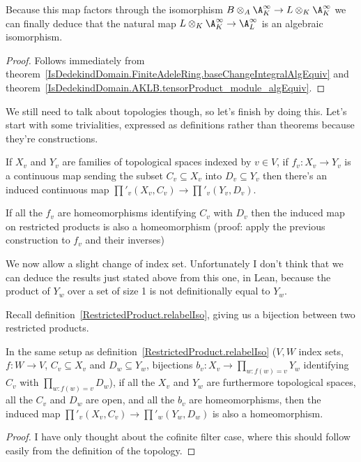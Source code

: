 Because this map factors through the isomorphism $B\otimes_A\A_K^\infty\to L\otimes_K\A_K^\infty$
we can finally deduce that the natural map $L\otimes_K\A_K^\infty\to\A_L^\infty$ is an algebraic
  isomorphism.
\begin{proof}
  Follows immediately from theorem~\ref{IsDedekindDomain.FiniteAdeleRing.baseChangeIntegralAlgEquiv}
  and theorem~\ref{IsDedekindDomain.AKLB.tensorProduct_module_algEquiv}.
\end{proof}

We still need to talk about topologies though, so let's finish by doing this. Let's start with some trivialities, expressed as definitions rather than theorems
because they're constructions.

\begin{definition} If $X_v$ and $Y_v$ are families of topological spaces indexed by $v\in V$,
  if $f_v:X_v\to Y_v$ is a continuous map sending the subset $C_v\subseteq X_v$ into
  $D_v\subseteq Y_v$ then there's an induced continuous map $\prod'_v(X_v,C_v)\to\prod'_v(Y_v,D_v)$.
\end{definition}

\begin{definition} If all the $f_v$ are homeomorphisms identifying $C_v$ with $D_v$ then
  the induced map on restricted products is also a homeomorphism (proof: apply the previous
  construction to $f_v$ and their inverses)
\end{definition}

We now allow a slight change of index set. Unfortunately I don't think that we can deduce
the results just stated above from this one, in Lean, because the product of $Y_w$ over a
set of size 1 is not definitionally equal to $Y_w$.

Recall definition~\ref{RestrictedProduct.relabelIso}, giving us a bijection between two restricted
products.

\begin{theorem} In the same setup as definition~\ref{RestrictedProduct.relabelIso}
  ($V,W$ index sets, $f:W\to V$,
  $C_v\subseteq X_v$ and $D_w\subseteq Y_w$, bijections $b_v:X_v\to\prod_{w:f(w)=v}Y_w$
  identifying $C_v$ with $\prod_{w:f(w)=v}D_w$), if all the $X_v$ and $Y_w$ are furthermore
  topological spaces, all the $C_v$ and $D_w$ are open, and all the $b_v$ are homeomorphisms,
  then the induced
  map $\prod'_v(X_v,C_v)\to\prod'_w(Y_w,D_w)$ is also a homeomorphism.
\end{theorem}
\begin{proof} I have only thought about the cofinite filter case, where this
  should follow easily from the definition of the topology.
\end{proof}

